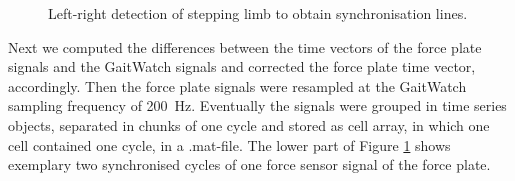 \begin{figure}
	\centering
	\caption{Left-right detection of stepping limb to obtain synchronisation lines.}
	\label{fig:left_right_detect}
\end{figure}

  Next we computed the differences between the time vectors of the force plate signals and the GaitWatch signals and corrected the force plate time vector, accordingly. Then the force plate signals were resampled at the GaitWatch sampling frequency of \mbox{200 Hz}. Eventually the signals were grouped in time series objects, separated in chunks of one cycle and stored as cell array, in which one cell contained one cycle, in a .mat-file. The lower part of Figure \ref{fig:left_right_detect} shows exemplary two synchronised cycles of one force sensor signal of the force plate.
 

